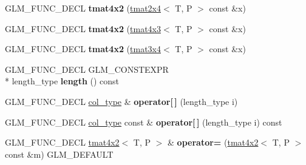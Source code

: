 \begin{DoxyCompactItemize}
\item 
\hypertarget{structglm_1_1tmat4x2_a0431dd5e59e115d3dec1a05bcce7d4de}{G\-L\-M\-\_\-\-F\-U\-N\-C\-\_\-\-D\-E\-C\-L {\bfseries tmat4x2} (\hyperlink{structglm_1_1tmat2x4}{tmat2x4}$<$ T, P $>$ const \&x)}\label{structglm_1_1tmat4x2_a0431dd5e59e115d3dec1a05bcce7d4de}

\item 
\hypertarget{structglm_1_1tmat4x2_a9676d9af93d2e420e78b0f70211c8133}{G\-L\-M\-\_\-\-F\-U\-N\-C\-\_\-\-D\-E\-C\-L {\bfseries tmat4x2} (\hyperlink{structglm_1_1tmat4x3}{tmat4x3}$<$ T, P $>$ const \&x)}\label{structglm_1_1tmat4x2_a9676d9af93d2e420e78b0f70211c8133}

\item 
\hypertarget{structglm_1_1tmat4x2_abf0131794c0a365765673847b3bbc454}{G\-L\-M\-\_\-\-F\-U\-N\-C\-\_\-\-D\-E\-C\-L {\bfseries tmat4x2} (\hyperlink{structglm_1_1tmat3x4}{tmat3x4}$<$ T, P $>$ const \&x)}\label{structglm_1_1tmat4x2_abf0131794c0a365765673847b3bbc454}

\item 
\hypertarget{structglm_1_1tmat4x2_a0585212fbe213444a14bc79c6e8615b4}{G\-L\-M\-\_\-\-F\-U\-N\-C\-\_\-\-D\-E\-C\-L G\-L\-M\-\_\-\-C\-O\-N\-S\-T\-E\-X\-P\-R \\*
length\-\_\-type {\bfseries length} () const }\label{structglm_1_1tmat4x2_a0585212fbe213444a14bc79c6e8615b4}

\item 
\hypertarget{structglm_1_1tmat4x2_ac3af29ca90810fd2da26fec983a46821}{G\-L\-M\-\_\-\-F\-U\-N\-C\-\_\-\-D\-E\-C\-L \hyperlink{structglm_1_1tvec2}{col\-\_\-type} \& {\bfseries operator\mbox{[}$\,$\mbox{]}} (length\-\_\-type i)}\label{structglm_1_1tmat4x2_ac3af29ca90810fd2da26fec983a46821}

\item 
\hypertarget{structglm_1_1tmat4x2_a5eda80996f1edab70245656b859168d4}{G\-L\-M\-\_\-\-F\-U\-N\-C\-\_\-\-D\-E\-C\-L \hyperlink{structglm_1_1tvec2}{col\-\_\-type} const \& {\bfseries operator\mbox{[}$\,$\mbox{]}} (length\-\_\-type i) const }\label{structglm_1_1tmat4x2_a5eda80996f1edab70245656b859168d4}

\item 
\hypertarget{structglm_1_1tmat4x2_a4646aaa8cbcd7f9d86cd88b43474bf2b}{G\-L\-M\-\_\-\-F\-U\-N\-C\-\_\-\-D\-E\-C\-L \hyperlink{structglm_1_1tmat4x2}{tmat4x2}$<$ T, P $>$ \& {\bfseries operator=} (\hyperlink{structglm_1_1tmat4x2}{tmat4x2}$<$ T, P $>$ const \&m) G\-L\-M\-\_\-\-D\-E\-F\-A\-U\-L\-T}\label{structglm_1_1tmat4x2_a4646aaa8cbcd7f9d86cd88b43474bf2b}


\end{DoxyCompactItemize}
